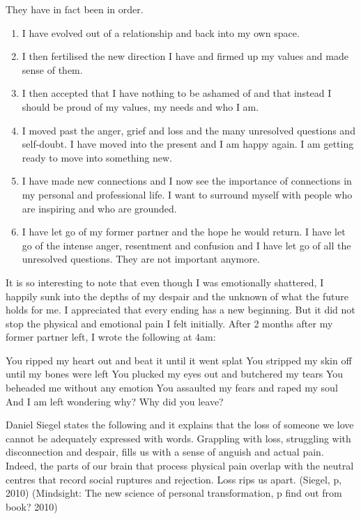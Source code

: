 They have in fact been in order. 

\begin{enumerate}
\item I have evolved out of a relationship and back into my own space. 
\item I then fertilised the new direction I have and firmed up my values and made sense of them. 
\item I then accepted that I have nothing to be ashamed of and that instead I should be proud of my values, my needs and who I am.
\item I moved past the anger, grief and loss and the many unresolved questions and self-doubt. I have moved into the present and I am happy again. I am getting ready to move into something new. 
\item  I have made new connections and I now see the importance of connections in my personal and professional life. I want to surround myself with people who are inspiring and who are grounded. 
\item I have let go of my former partner and the hope he would return. I have let go of the intense anger, resentment and confusion and I have let go of all the unresolved questions. They are not important anymore. 
\end{enumerate}

It is so interesting to note that even though I was emotionally shattered, I happily sunk into the depths of my despair and the unknown of what the future holds for me. I appreciated that every ending has a new beginning. But it did not stop the physical and emotional pain I felt initially. After 2 months after my former partner left, I wrote the following at 4am:
	
You ripped my heart out and beat it until it went splat
You stripped my skin off until my bones were left
You plucked my eyes out and butchered my tears
You beheaded me without any emotion 
You assaulted my fears and raped my soul
And I am left wondering why? Why did you leave?

Daniel Siegel states the following and it explains that the loss of someone we love cannot be adequately expressed with words. Grappling with loss, struggling with disconnection and despair, fills us with a sense of anguish and actual pain. Indeed, the parts of our brain that process physical pain overlap with the neutral centres that record social ruptures and rejection. Loss rips us apart. (Siegel, p, 2010) 
(Mindsight: The new science of personal transformation, p find out from book? 2010) 

